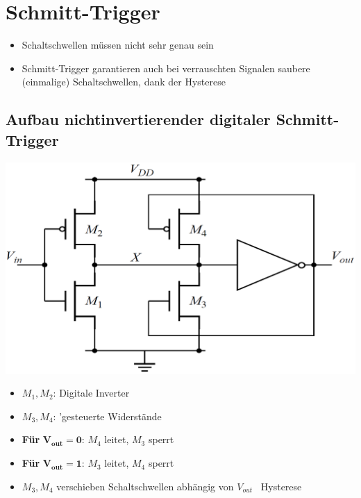 \section{Schmitt-Trigger}

\begin{itemize}
    \item Schaltschwellen müssen nicht sehr genau sein
    \item Schmitt-Trigger garantieren auch bei verrauschten Signalen saubere (einmalige) Schaltschwellen, dank der Hysterese
\end{itemize}



\subsection{Aufbau nichtinvertierender digitaler Schmitt-Trigger}

\begin{minipage}[position]{0.35\columnwidth}
    \includegraphics[width=\columnwidth]{images/nichtinvertierender_schmitt-trigger.png}
\end{minipage}
\hfill
\begin{minipage}[position]{0.63\columnwidth}
    \begin{itemize}
        \item $M_1, M_2$: Digitale Inverter
        \item $M_3, M_4$: 'gesteuerte Widerstände
        \item \textbf{Für }$\boldsymbol{V_{out} = 0}$: $M_4$ leitet, $M_3$ sperrt
        \item \textbf{Für }$\boldsymbol{V_{out} = 1}$: $M_3$ leitet, $M_4$ sperrt
        \item $M_3, M_4$ verschieben Schaltschwellen abhängig von $V_{out}$ \textrightarrow\ Hysterese
    \end{itemize}
\end{minipage}


